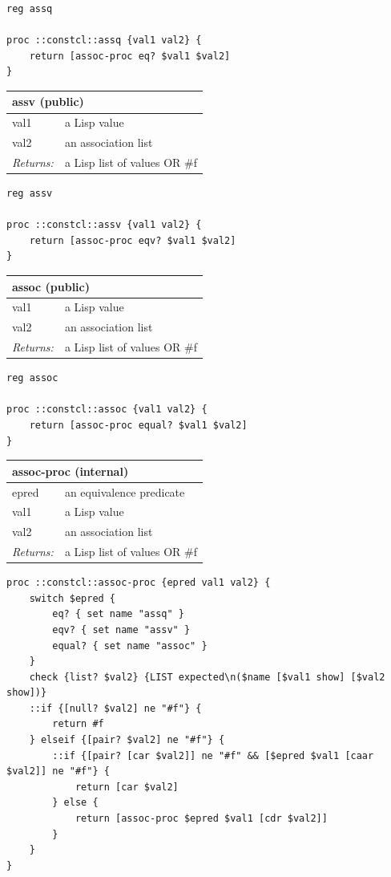 \documentclass[twoside,9pt]{report}
\begin{document}
\noindent\makebox[\linewidth]{\rule{\linewidth}{0.4pt}}
\begin{lstlisting}
reg assq
 
proc ::constcl::assq {val1 val2} {
    return [assoc-proc eq? $val1 $val2]
}
\end{lstlisting}
\noindent\makebox[\linewidth]{\rule{\linewidth}{0.4pt}}
\begin{tabular}{ |l l| }
\hline
\multicolumn{2}{|l|}{assv (public)} \\
\hline
val1 & a Lisp value \\
val2 & an association list \\
\textit{Returns:} & a Lisp list of values OR \#f \\
\hline
\end{tabular}

\noindent\makebox[\linewidth]{\rule{\linewidth}{0.4pt}}
\begin{lstlisting}
reg assv
 
proc ::constcl::assv {val1 val2} {
    return [assoc-proc eqv? $val1 $val2]
}
\end{lstlisting}
\noindent\makebox[\linewidth]{\rule{\linewidth}{0.4pt}}
\begin{tabular}{ |l l| }
\hline
\multicolumn{2}{|l|}{assoc (public)} \\
\hline
val1 & a Lisp value \\
val2 & an association list \\
\textit{Returns:} & a Lisp list of values OR \#f \\
\hline
\end{tabular}

\noindent\makebox[\linewidth]{\rule{\linewidth}{0.4pt}}
\begin{lstlisting}
reg assoc
 
proc ::constcl::assoc {val1 val2} {
    return [assoc-proc equal? $val1 $val2]
}
\end{lstlisting}
\noindent\makebox[\linewidth]{\rule{\linewidth}{0.4pt}}
\begin{tabular}{ |l l| }
\hline
\multicolumn{2}{|l|}{assoc-proc (internal)} \\
\hline
epred & an equivalence predicate \\
val1 & a Lisp value \\
val2 & an association list \\
\textit{Returns:} & a Lisp list of values OR \#f \\
\hline
\end{tabular}

\noindent\makebox[\linewidth]{\rule{\linewidth}{0.4pt}}
\begin{lstlisting}
proc ::constcl::assoc-proc {epred val1 val2} {
    switch $epred {
        eq? { set name "assq" }
        eqv? { set name "assv" }
        equal? { set name "assoc" }
    }
    check {list? $val2} {LIST expected\n($name [$val1 show] [$val2 show])}
    ::if {[null? $val2] ne "#f"} {
        return #f
    } elseif {[pair? $val2] ne "#f"} {
        ::if {[pair? [car $val2]] ne "#f" && [$epred $val1 [caar $val2]] ne "#f"} {
            return [car $val2]
        } else {
            return [assoc-proc $epred $val1 [cdr $val2]]
        }
    }
}
\end{lstlisting}
\noindent\makebox[\linewidth]{\rule{\linewidth}{0.4pt}}
\end{document}
